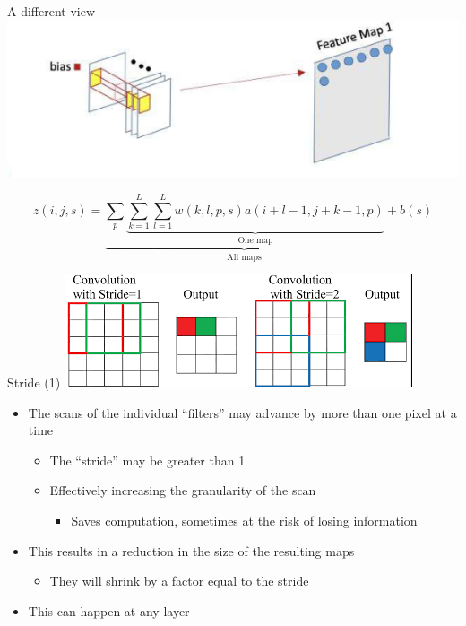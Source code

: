 \documentclass[default, aspectratio=169]{beamer}
\begin{document}
	\begin{frame}{A different view}
		\centering
		\includegraphics[keepaspectratio, scale=0.9]{pic/diff_view.png}
		
		
		\[ z(i,j,s) = \underbrace{\sum_p \underbrace{\sum_{k=1}^{L} \sum_{l=1}^{L} w(k,l,p,s) a(i+l-1, j+k-1, p)}_{\text{One map}}}_{\text{All maps}} + b(s) \]
		
	\end{frame}
	\begin{frame}{Stride (1)}
		\centering
		\includegraphics[keepaspectratio, scale=0.9]{pic/stride.png}
		\begin{itemize}
			\item The scans of the individual ``filters'' may advance by more than one pixel at a time
			\begin{itemize}
				\item The ``stride'' may be greater than 1
				\item Effectively increasing the granularity of the scan
				\begin{itemize}
					\item Saves computation, sometimes at the risk of losing information
				\end{itemize}
			\end{itemize}
			\item This results in a reduction in the size of the resulting maps
			\begin{itemize}
				\item They will shrink by a factor equal to the stride
			\end{itemize}
			\item This can happen at any layer
		\end{itemize}
	\end{frame}
\end{document}
